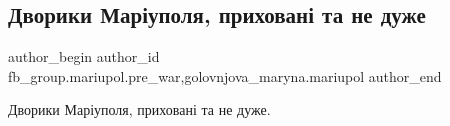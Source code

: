  
 
 
 
 

\subsection{Дворики Маріуполя, приховані та не дуже}
\label{sec:11_02_2023.fb.fb_group.mariupol.pre_war.10.dvoriki_mar_upolya__}
 
\ifcmt
 author_begin
   author_id fb_group.mariupol.pre_war,golovnjova_maryna.mariupol
 author_end
\fi

Дворики Маріуполя, приховані та не дуже.

